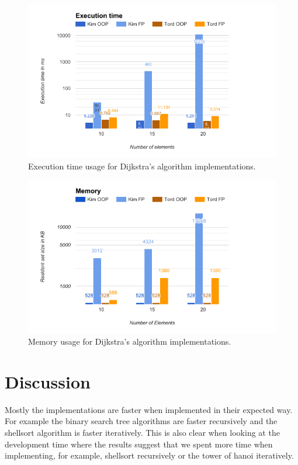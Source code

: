 \documentclass {article}
\begin{document}
\begin{figure}[H]
\includegraphics[width=\textwidth]{dijkstras-runtime}

\caption{Execution time usage for Dijkstra's algorithm implementations.}
\label{fig:dijkstras-runtime}
\end{figure}

\begin{figure}[H]
\includegraphics[width=\textwidth]{dijkstras-memory}

\caption{Memory usage for Dijkstra's algorithm implementations.}
\label{fig:dijkstras-memory}
\end{figure}

\section{Discussion}
Mostly the implementations are faster when implemented in their expected way. For example the binary search tree algorithms are faster recursively and the shellsort algorithm is faster iteratively. This is also clear when looking at the development time where the results suggest that we spent more time when implementing, for example, shellsort recursively or the tower of hanoi iteratively. 
\end{document}
